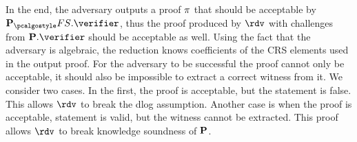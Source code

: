 \documentclass[runningheads,11pt]{llncs}
\theoremstyle{definition}
\begin{document}
{In the end, the adversary outputs a proof $\pi$ that should be acceptable
by $\plonkprotfs.\verifier$, thus the proof produced by $\rdv$ with challenges
from $\plonkprot.\verifier$ should be acceptable as well. Using the fact that
the adversary is algebraic, the reduction knows coefficients of the CRS elements
used in the output proof. For the adversary to be successful the proof cannot
only be acceptable, it should also be impossible to extract a correct witness
from it. We consider two cases. In the first, the proof is acceptable, but the
statement is false. This allows $\rdv$ to break the dlog assumption.
 Another case is when the proof is acceptable, statement is valid, but the witness cannot be extracted. This proof allows $\rdv$ to break knowledge soundness of $\mathbf{P}$.
}
\end{document}
